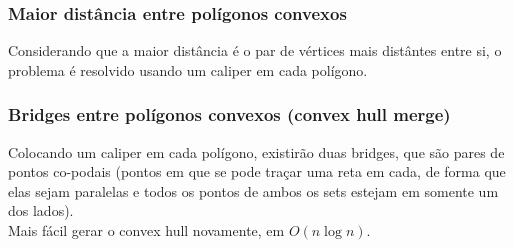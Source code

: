 \subsubsection{Maior dist\^{a}ncia entre pol\'{i}gonos convexos}
Considerando que a maior dist\^{a}ncia \'{e} o par de v\'{e}rtices mais dist\^{a}ntes entre si, o problema \'{e}  resolvido usando um caliper em cada pol\'{i}gono.
\divisor

\subsubsection{Bridges entre pol\'{i}gonos convexos (convex hull merge)}
Colocando um caliper em cada pol\'{i}gono, existir\~{a}o duas bridges, que s\~{a}o pares de pontos co-podais (pontos em que se pode tra\c{c}ar uma reta em cada, de forma que elas sejam paralelas e todos os pontos de ambos os sets estejam em somente um dos lados).
\\ Mais f\'{a}cil gerar o convex hull novamente, em $O(n \log{n})$.
\divisor
